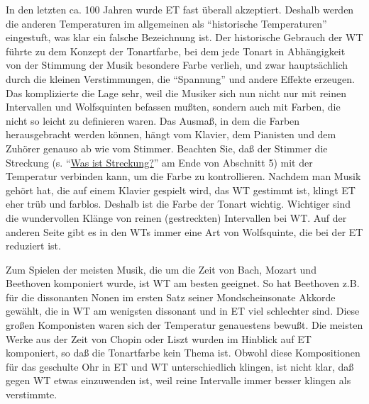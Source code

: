 In den letzten ca. 100 Jahren wurde ET fast überall akzeptiert.
Deshalb werden die anderen Temperaturen im allgemeinen als \enquote{historische Temperaturen} eingestuft, was klar ein falsche Bezeichnung ist.
Der historische Gebrauch der WT führte zu dem Konzept der Tonartfarbe, bei dem jede Tonart in Abhängigkeit von der Stimmung der Musik besondere Farbe verlieh, und zwar hauptsächlich durch die kleinen Verstimmungen, die \enquote{Spannung} und andere Effekte erzeugen.
Das komplizierte die Lage sehr, weil die Musiker sich nun nicht nur mit reinen Intervallen und Wolfsquinten befassen mußten, sondern auch mit Farben, die nicht so leicht zu definieren waren.
Das Ausmaß, in dem die Farben herausgebracht werden können, hängt vom Klavier, dem Pianisten und dem Zuhörer genauso ab wie vom Stimmer.
Beachten Sie, daß der Stimmer die Streckung (s. \enquote{\hyperref[c2_5_stre]{Was ist Streckung?}} am Ende von Abschnitt 5) mit der Temperatur verbinden kann, um die Farbe zu kontrollieren.
Nachdem man Musik gehört hat, die auf einem Klavier gespielt wird, das WT gestimmt ist, klingt ET eher trüb und farblos.
Deshalb ist die Farbe der Tonart wichtig.
Wichtiger sind die wundervollen Klänge von reinen (gestreckten) Intervallen bei WT.
Auf der anderen Seite gibt es in den WTs immer eine Art von Wolfsquinte, die bei der ET reduziert ist.

Zum Spielen der meisten Musik, die um die Zeit von Bach, Mozart und Beethoven komponiert wurde, ist WT am besten geeignet.
So hat Beethoven z.B. für die dissonanten Nonen im ersten Satz seiner Mondscheinsonate Akkorde gewählt, die in WT am wenigsten dissonant und in ET viel schlechter sind.
Diese großen Komponisten waren sich der Temperatur genauestens bewußt.
Die meisten Werke aus der Zeit von Chopin oder Liszt wurden im Hinblick auf ET komponiert, so daß die Tonartfarbe kein Thema ist.
Obwohl diese Kompositionen für das geschulte Ohr in ET und WT unterschiedlich klingen, ist nicht klar, daß gegen WT etwas einzuwenden ist, weil reine Intervalle immer besser klingen als verstimmte.

